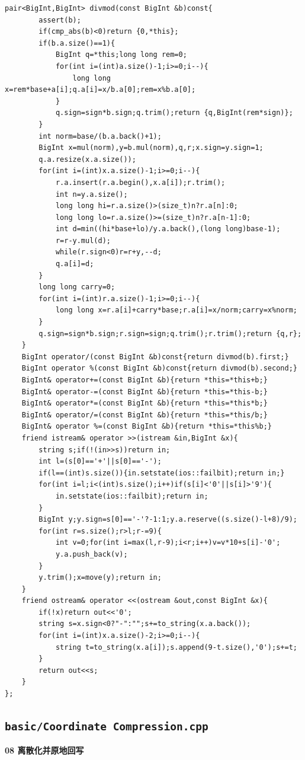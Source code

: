 \documentclass[UTF8,a4paper,10pt]{ctexart}
\begin{document}
\begin{lstlisting}[firstnumber=1]
	pair<BigInt,BigInt> divmod(const BigInt &b)const{
		assert(b);
		if(cmp_abs(b)<0)return {0,*this};
		if(b.a.size()==1){
			BigInt q=*this;long long rem=0;
			for(int i=(int)a.size()-1;i>=0;i--){
				long long x=rem*base+a[i];q.a[i]=x/b.a[0];rem=x%b.a[0];
			}
			q.sign=sign*b.sign;q.trim();return {q,BigInt(rem*sign)};
		}
		int norm=base/(b.a.back()+1);
		BigInt x=mul(norm),y=b.mul(norm),q,r;x.sign=y.sign=1;
		q.a.resize(x.a.size());
		for(int i=(int)x.a.size()-1;i>=0;i--){
			r.a.insert(r.a.begin(),x.a[i]);r.trim();
			int n=y.a.size();
			long long hi=r.a.size()>(size_t)n?r.a[n]:0;
			long long lo=r.a.size()>=(size_t)n?r.a[n-1]:0;
			int d=min((hi*base+lo)/y.a.back(),(long long)base-1);
			r=r-y.mul(d);
			while(r.sign<0)r=r+y,--d;
			q.a[i]=d;
		}
		long long carry=0;
		for(int i=(int)r.a.size()-1;i>=0;i--){
			long long x=r.a[i]+carry*base;r.a[i]=x/norm;carry=x%norm;
		}
		q.sign=sign*b.sign;r.sign=sign;q.trim();r.trim();return {q,r};
	}
	BigInt operator/(const BigInt &b)const{return divmod(b).first;}
	BigInt operator %(const BigInt &b)const{return divmod(b).second;}
	BigInt& operator+=(const BigInt &b){return *this=*this+b;}
	BigInt& operator-=(const BigInt &b){return *this=*this-b;}
	BigInt& operator*=(const BigInt &b){return *this=*this*b;}
	BigInt& operator/=(const BigInt &b){return *this=*this/b;}
	BigInt& operator %=(const BigInt &b){return *this=*this%b;}
	friend istream& operator >>(istream &in,BigInt &x){
		string s;if(!(in>>s))return in;
		int l=(s[0]=='+'||s[0]=='-');
		if(l==(int)s.size()){in.setstate(ios::failbit);return in;}
		for(int i=l;i<(int)s.size();i++)if(s[i]<'0'||s[i]>'9'){
			in.setstate(ios::failbit);return in;
		}
		BigInt y;y.sign=s[0]=='-'?-1:1;y.a.reserve((s.size()-l+8)/9);
		for(int r=s.size();r>l;r-=9){
			int v=0;for(int i=max(l,r-9);i<r;i++)v=v*10+s[i]-'0';
			y.a.push_back(v);
		}
		y.trim();x=move(y);return in;
	}
	friend ostream& operator <<(ostream &out,const BigInt &x){
		if(!x)return out<<'0';
		string s=x.sign<0?"-":"";s+=to_string(x.a.back());
		for(int i=(int)x.a.size()-2;i>=0;i--){
			string t=to_string(x.a[i]);s.append(9-t.size(),'0');s+=t;
		}
		return out<<s;
	}
};
\end{lstlisting}
\par\vspace{1em}
\subsection{\texttt{basic/Coordinate Compression.cpp}}
\textbf{08 离散化并原地回写}
\end{document}
